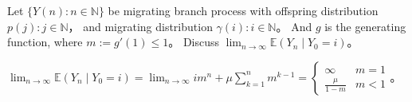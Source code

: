 \documentclass{ctexart}
\begin{document}
\begin{problem}\label{pro:6}
  Let \(\{Y(n): n \in \mathbb{N}\}\) be migrating branch process with offspring distribution \(p(j): j \in \mathbb{N}\)\nolinebreak[4]，
  and migrating distribution \(\gamma(i):i \in \mathbb{N}\)\nolinebreak[4]。
  And \(g\) is the generating function, where \(m :=g' (1) \leq 1\)\nolinebreak[4]。
  Discuss \(\lim_{n \to \infty}\mathbb{E}(Y_n \mid Y_0=i)\)\nolinebreak[4]。
\end{problem}
\begin{solution}
  \(\lim_{n \to \infty}\mathbb{E}(Y_n \mid Y_0=i)=\lim_{n \to \infty}im^n + \mu \sum_{k=1}^{n} m^{k-1}=
    \begin{cases}
      \infty          & m=1  \\
      \frac{\mu}{1-m} & m <1
  \end{cases}\)\nolinebreak[4]。
\end{solution}
\end{document}
